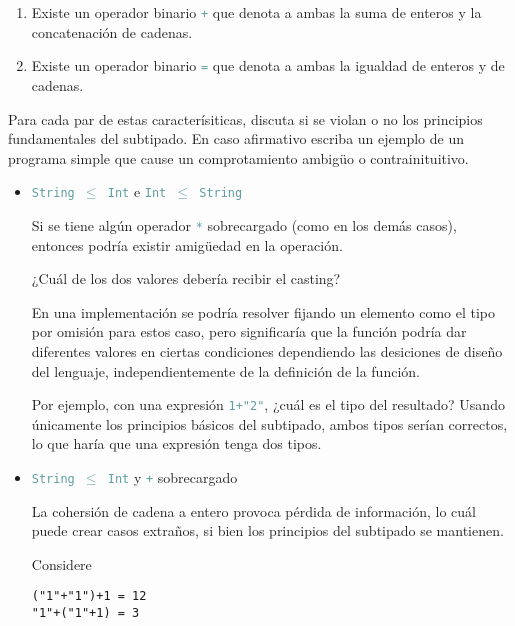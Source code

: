 \documentclass{article}
\newcommand{\tp}[1]{\textcolor{CadetBlue} {\texttt{#1}}}
\begin{document}
\begin{enumerate}
\begin{enumerate}
            \item Existe un operador binario \tp{+} que denota a ambas la suma
            de enteros y la concatenación de cadenas.

            \item Existe un operador binario \tp{=} que denota a ambas la
            igualdad de enteros y de cadenas.
        \end{enumerate}

        Para cada par de estas caracterísiticas, discuta si se violan o no los
        principios fundamentales del subtipado. En caso afirmativo escriba un
        ejemplo de un programa simple que cause un comprotamiento ambigüo o
        contrainituitivo.

        \begin{itemize}
            \item \tp{String $\leq$ Int} e \tp{Int $\leq$ String}

            Si se tiene algún operador \tp{*} sobrecargado (como en los demás
            casos), entonces podría existir amigüedad en la operación.

            ¿Cuál de los dos valores debería recibir el casting?

            En una implementación se podría resolver fijando un elemento como el
            tipo por omisión para estos caso, pero significaría que la función
            podría dar diferentes valores en ciertas condiciones dependiendo las
            desiciones de diseño del lenguaje, independientemente de la
            definición de la función.

            Por ejemplo, con una expresión \tp{1+"2"}, ¿cuál es el tipo del
            resultado? Usando únicamente los principios básicos del subtipado, 
            ambos tipos serían correctos, lo que haría que una expresión tenga 
            dos tipos.

            \item \tp{String $\leq$ Int} y \tp{+} sobrecargado

            La cohersión de cadena a entero provoca pérdida de información, lo 
            cuál puede crear casos extraños, si bien los principios del 
            subtipado se mantienen.

            Considere

            \begin{verbatim}
("1"+"1")+1 = 12
"1"+("1"+1) = 3
            \end{verbatim}


\end{itemize}
\end{enumerate}
\end{document}
